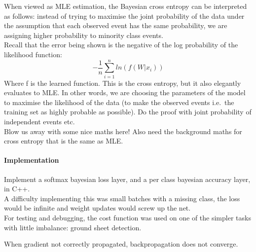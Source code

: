 \documentclass[a4paper,11pt]{article}
\begin{document}
When viewed as MLE estimation, the Bayesian cross entropy can be interpreted as follows: instead of trying to maximise the joint probability of the data under the assumption that each observed event has the same probability, we are assigning higher probability to minority class events. \\

Recall that the error being shown is the negative of the log probability of the likelihood function:
\begin{equation}
-\frac{1}{n}\sum\limits_{i=1}^n ln(f(W|x_i))
\end{equation}
Where f is the learned function. This is the cross entropy, but it also elegantly evaluates to MLE. In other words, we are choosing the parameters of the model to maximise the likelihood of the data (to make the observed events i.e.\ the training set as highly probable as possible). Do the proof with joint probability of independent events etc. \\

Blow us away with some nice maths here! Also need the background maths for cross entropy that is the same as MLE. \\


\paragraph{Implementation}

Implement a softmax bayesian loss layer, and a per class bayesian accuracy layer, in C++. \\

A difficulty implementing this was small batches with a missing class, the loss would be infinite and weight updates would screw up the net. \\

For testing and debugging, the cost function was used on one of the simpler tasks with little imbalance: ground sheet detection. 

When gradient not correctly propagated, backpropagation does not converge. \\
\end{document}
